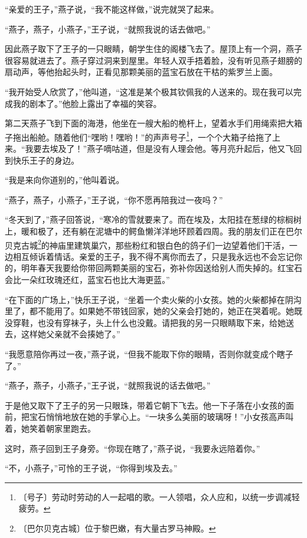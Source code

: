 \documentclass[12pt,UTF-8,openany]{ctexbook}
\begin{document}
\begin{large}
    “亲爱的王子，”燕子说，“我不能这样做，”说完就哭了起来。
    
    “燕子，燕子，小燕子，”王子说，“就照我说的话去做吧。”
    
    因此燕子取下了王子的一只眼睛，朝学生住的阁楼飞去了。屋顶上有一个洞，燕子很容易就进去了。燕子穿过洞来到屋里。年轻人双手捂着脸，没有听见燕子翅膀的扇动声，等他抬起头时，正看见那颗美丽的蓝宝石放在干枯的紫罗兰上面。
    
    “我开始受人欣赏了，”他叫道，“这准是某个极其钦佩我的人送来的。现在我可以完成我的剧本了。”他脸上露出了幸福的笑容。
    
    第二天燕子飞到下面的海港，他坐在一艘大船的桅杆上，望着水手们用绳索把大箱子拖出船舱。随着他们“嘿哟！嘿哟！”的声声号子\footnote{〔号子〕劳动时劳动的人一起唱的歌。一人领唱，众人应和，以统一步调减轻疲劳。}，一个个大箱子给拖了上来。“我要去埃及了！”燕子嘀咕道，但是没有人理会他。等月亮升起后，他又飞回到快乐王子的身边。
    
    “我是来向你道别的，”他叫着说。
    
    “燕子，燕子，小燕子，”王子说，“你不愿再陪我过一夜吗？”
    
    “冬天到了，”燕子回答说，“寒冷的雪就要来了。而在埃及，太阳挂在葱绿的棕榈树上，暖和极了，还有躺在泥塘中的鳄鱼懒洋洋地环顾着四周。我的朋友们正在巴尔贝克古城\footnote{〔巴尔贝克古城〕位于黎巴嫩，有大量古罗马神殿。}的神庙里建筑巢穴，那些粉红和银白色的鸽子们一边望着他们干活，一边相互倾诉着情话。亲爱的王子，我不得不离你而去了，只是我永远也不会忘记你的，明年春天我要给你带回两颗美丽的宝石，弥补你因送给别人而失掉的。红宝石会比一朵红玫瑰还红，蓝宝石也比大海更蓝。”
    
    “在下面的广场上，”快乐王子说，“坐着一个卖火柴的小女孩。她的火柴都掉在阴沟里了，都不能用了。如果她不带钱回家，她的父亲会打她的，她正在哭着呢。她既没穿鞋，也没有穿袜子，头上什么也没戴。请把我的另一只眼睛取下来，给她送去，这样她父亲就不会揍她了。”
    
    “我愿意陪你再过一夜，”燕子说，“但我不能取下你的眼睛，否则你就变成个瞎子了。”
    
    “燕子，燕子，小燕子，”王子说，“就照我说的话去做吧。”
    
    于是他又取下了王子的另一只眼珠，带着它朝下飞去。他一下子落在小女孩的面前，把宝石悄悄地放在她的手掌心上。“一块多么美丽的玻璃呀！”小女孩高声叫着，她笑着朝家里跑去。
    
    这时，燕子回到王子身旁。“你现在瞎了，”燕子说，“我要永远陪着你。”
    
    “不，小燕子，”可怜的王子说，“你得到埃及去。”
    

\end{large}
\end{document}
